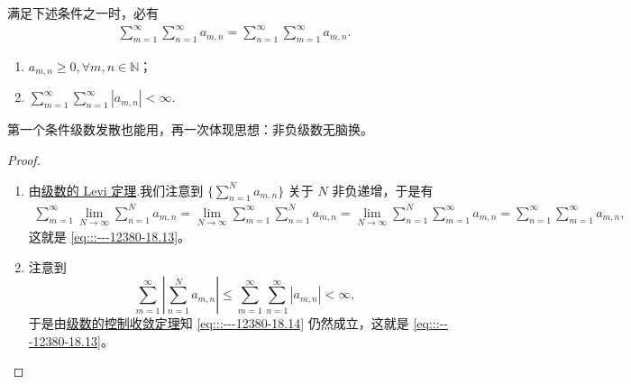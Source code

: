 \documentclass[../../main.tex]{subfiles}%
\begin{document}
\begin{theorem}[级数的Fubini定理]\label{theorem:级数的Fubini定理}满足下述条件之一时，必有
\begin{align}
\sum_{m = 1}^{\infty} \sum_{n = 1}^{\infty} a_{m,n} = \sum_{n = 1}^{\infty} \sum_{m = 1}^{\infty} a_{m,n}. \label{eq:::---12380-18.13}
\end{align}
\begin{enumerate}
\item \( a_{m,n} \geqslant 0, 
\forall m, n \in \mathbb{N} \)；

\item $\sum_{m = 1}^{\infty} \sum_{n = 1}^{\infty} |a_{m,n}| < \infty.$
\end{enumerate}
\end{theorem}
\begin{note}
第一个条件级数发散也能用，再一次体现思想：非负级数无脑换。
\end{note}
\begin{proof}
\begin{enumerate}
\item 由\hyperref[theorem:级数的Levi定理]{级数的 Levi 定理}.我们注意到 \( \{\sum_{n = 1}^{N} a_{m,n} \}\) 关于 \( N \) 非负递增，于是有
\begin{align}
\sum_{m = 1}^{\infty} \lim_{N \to \infty} \sum_{n = 1}^{N} a_{m,n} = \lim_{N \to \infty} \sum_{m = 1}^{\infty} \sum_{n = 1}^{N} a_{m,n} = \lim_{N \to \infty} \sum_{n = 1}^{N} \sum_{m = 1}^{\infty} a_{m,n} = \sum_{n = 1}^{\infty} \sum_{m = 1}^{\infty} a_{m,n}, \label{eq:::---12380-18.14}
\end{align}
这就是 \eqref{eq:::---12380-18.13}。

\item 注意到
\[
\sum_{m = 1}^{\infty} \left| \sum_{n = 1}^{N} a_{m,n} \right| \leqslant \sum_{m = 1}^{\infty} \sum_{n = 1}^{\infty} |a_{m,n}| < \infty,
\]
于是由\hyperref[theorem:级数的控制收敛定理]{级数的控制收敛定理}知 \eqref{eq:::---12380-18.14} 仍然成立，这就是 \eqref{eq:::---12380-18.13}。
\end{enumerate}

\end{proof}
\end{document}

